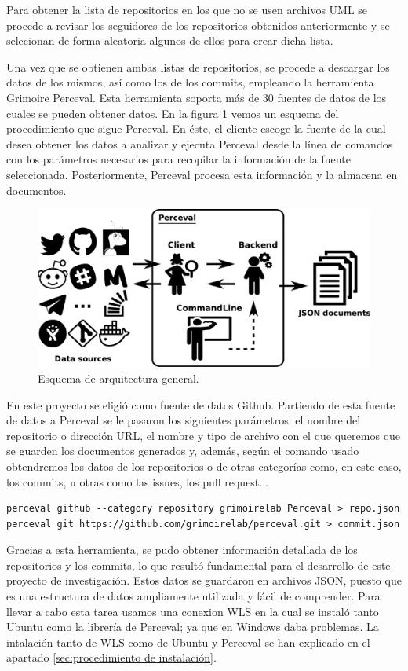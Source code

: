 \documentclass[a4paper, 12pt]{book}
\begin{document}
Para obtener la lista de repositorios en los que no se usen archivos UML se procede a revisar los seguidores de los repositorios obtenidos anteriormente y se selecionan de forma aleatoria algunos de ellos para crear dicha lista.


Una vez que se obtienen ambas listas de repositorios, se procede a descargar los datos de los mismos, así como los de los commits, empleando la herramienta Grimoire Perceval.
Esta herramienta soporta más de 30 fuentes de datos de los cuales se pueden obtener datos.
En la figura \ref{fig:perceval-json} vemos un esquema del procedimiento que sigue Perceval. 
En éste, el cliente escoge la fuente de la cual desea obtener los datos a analizar y ejecuta Perceval desde la línea de comandos con los parámetros necesarios para recopilar la información de la fuente seleccionada.
Posteriormente, Perceval procesa esta información y la almacena en documentos. 

\begin{figure}
  \centering
  \includegraphics[width=12cm, keepaspectratio]{img/perceval-json.png}
  \caption{Esquema de arquitectura general.}\label{fig:perceval-json}
\end{figure}


En este proyecto se eligió como fuente de datos Github. 
Partiendo de esta fuente de datos a Perceval se le pasaron los siguientes parámetros: el nombre del repositorio o dirección URL, el nombre y tipo de archivo con el que queremos que se guarden los documentos generados y, además, según el comando usado obtendremos los datos de los repositorios o de otras categorías como, en este caso, los commits, u otras como las issues, los pull request...
\begin{verbatim}
perceval github --category repository grimoirelab Perceval > repo.json
perceval git https://github.com/grimoirelab/perceval.git > commit.json
\end{verbatim} 
    

Gracias a esta herramienta, se pudo obtener información detallada de los repositorios y los commits, lo que resultó fundamental para el desarrollo de este proyecto de investigación.
Estos datos se guardaron en archivos JSON, puesto que es una estructura de datos ampliamente utilizada y fácil de comprender.
Para llevar a cabo esta tarea usamos una conexion WLS en la cual se instaló tanto Ubuntu como la librería de Perceval; ya que en Windows daba problemas.
La intalación tanto de WLS como de Ubuntu y Perceval se han explicado en el apartado \ref{sec:procedimiento de instalación}.
\end{document}
